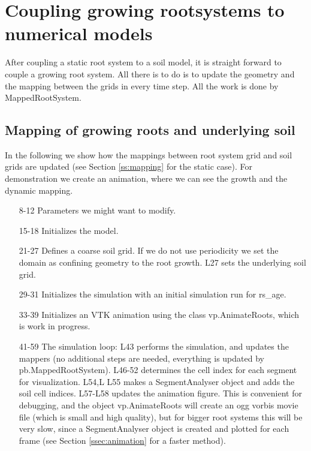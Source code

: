 \newpage
\section{Coupling growing rootsystems to numerical models} \label{sec:growing}

After coupling a static root system to a soil model, it is straight forward to couple a growing root system. All there is to do is to update the geometry and the mapping between the grids in every time step. All the work is done by MappedRootSystem.

    
\subsection{Mapping of growing roots and underlying soil} 

In the following we show how the mappings between root system grid and soil grids are updated (see Section \ref{ss:mapping} for the static case). For demonstration we create an animation, where we can see the growth and the dynamic mapping. 



\begin{itemize}
\item[8-12] Parameters we might want to modify. 
\item[15-18] Initializes the model.
\item[21-27] Defines a coarse soil grid. If we do not use periodicity we set the domain as confining geometry to the root growth. L27 sets the underlying soil grid.
\item[29-31] Initializes the simulation with an initial simulation run for rs\_age.
\item[33-39] Initializes an VTK animation using the class vp.AnimateRoots, which is work in progress. 
\item[41-59] The simulation loop: L43 performs the simulation, and updates the mappers (no additional steps are needed, everything is updated by pb.MappedRootSystem). L46-52 determines the cell index for each segment for visualization. L54,L L55 makes a SegmentAnalyser object and adds the soil cell indices. L57-L58 updates the animation figure. This is convenient for debugging, and the object vp.AnimateRoots will create an ogg vorbis movie file (which is small and high quality), but for bigger root systems this will be very slow, since a SegmentAnalyser object is created and plotted for each frame (see Section \ref{ssec:animation} for a faster method).
\end{itemize}

